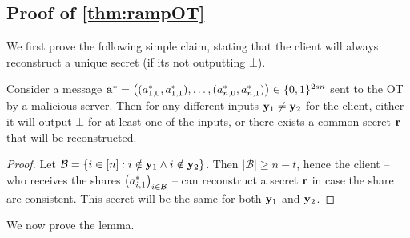 \documentclass{llncs}
\renewcommand{\B}{\mathcal{B}}
\renewcommand{\a}{\myvec{a}}
\newcommand{\y}{\myvec{y}}
\begin{document}
\subsection{Proof of \texorpdfstring{\cref{thm:rampOT}}{Lemma 5}}\label{sec:missing}
We first prove the following simple claim, stating that the client will always reconstruct a unique secret (if its not outputting $\bot$).
\begin{claim}\label{clm:oneSecret}
Consider a message $\a^*=\vect{(a^*_{1,0},a^*_{1,1}),\ldots,(a^*_{n,0},a^*_{n,1})}\in\zo^{2sn}$ sent to the OT by a malicious server. Then for any different inputs $\y_1\ne\y_2$ for the client, either it will output $\bot$ for at least one of the inputs, or there exists a common secret ${\bf r}$ that  will be reconstructed. 
\end{claim}
\begin{proof}
Let $\B=\set{i\in[n]:i\notin\y_1\wedge i\notin\y_2}$. Then $|\B|\geq n-t$, hence the client -- who receives the shares $\vect{a^*_{i,1}}_{i\in\B}$ -- can reconstruct a secret ${\bf r}$ in case the share are consistent. This secret will be the same for both $\y_1$ and $\y_2$. 
\end{proof}

We now prove the lemma.
\end{document}
